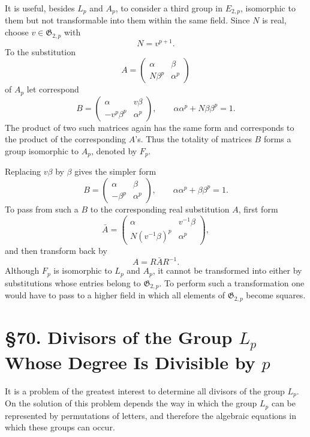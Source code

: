 \documentclass[11pt,a4paper]{book}
\newcommand{\webersection}[2]{\clearpage\section*{\S #1. #2}}
\providecommand{\N}{\operatorname{N}}
\begin{document}
It is useful, besides \(L_p\) and \(A_p\), to consider a third group in \(E_{2,p}\), isomorphic to them but not transformable into them within the same field.  Since \(N\) is real, choose \(v\in\mathfrak G_{2,p}\) with
\[
 N=v^{p+1}.
\]
To the substitution
\[
 A=\begin{pmatrix}\alpha&\beta\\N\beta^p&\alpha^p\end{pmatrix}
\]
of \(A_p\) let correspond
\begin{equation}\label{eq:69-13}
 B=\begin{pmatrix}\alpha&v\beta\\-v^p\beta^p&\alpha^p\end{pmatrix},
 \qquad \alpha\alpha^p+N\beta\beta^p=1.
\end{equation}
The product of two such matrices again has the same form and corresponds to the product of the corresponding \(A\)'s.  Thus the totality of matrices \(B\) forms a group isomorphic to \(A_p\), denoted by \(F_p\).

Replacing \(v\beta\) by \(\beta\) gives the simpler form
\begin{equation}\label{eq:69-14}
 B=\begin{pmatrix}\alpha&\beta\\-\beta^p&\alpha^p\end{pmatrix},
 \qquad \alpha\alpha^p+\beta\beta^p=1.
\end{equation}
To pass from such a \(B\) to the corresponding real substitution \(A\), first form
\begin{equation}\label{eq:69-15}
 \bar A=\begin{pmatrix}\alpha&v^{-1}\beta\\N(v^{-1}\beta)^p&\alpha^p\end{pmatrix},
\end{equation}
and then transform back by
\begin{equation}\label{eq:69-16}
 A=R\bar A R^{-1}.
\end{equation}
Although \(F_p\) is isomorphic to \(L_p\) and \(A_p\), it cannot be transformed into either by substitutions whose entries belong to \(\mathfrak G_{2,p}\).  To perform such a transformation one would have to pass to a higher field in which all elements of \(\mathfrak G_{2,p}\) become squares.

\newpage

\webersection{70}{Divisors of the Group \(L_p\) Whose Degree Is Divisible by \(p\)}

It is a problem of the greatest interest to determine all divisors of the group \(L_p\).  On the solution of this problem depends the way in which the group \(L_p\) can be represented by permutations of letters, and therefore the algebraic equations in which these groups can occur.
\end{document}
